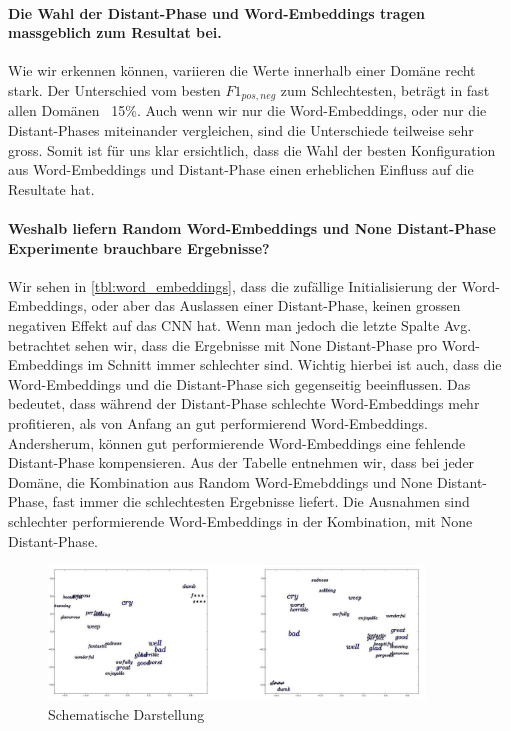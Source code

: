 \paragraph{Die Wahl der Distant-Phase und Word-Embeddings tragen massgeblich zum Resultat bei.} Wie wir erkennen können, variieren die Werte innerhalb einer Domäne recht stark. Der Unterschied vom besten $F1_{pos,neg}$ zum Schlechtesten, beträgt in fast allen Domänen ~15\%. Auch wenn wir nur die Word-Embeddings, oder nur die Distant-Phases miteinander vergleichen, sind die Unterschiede teilweise sehr gross. Somit ist für uns klar ersichtlich, dass die Wahl der besten Konfiguration aus Word-Embeddings und Distant-Phase einen erheblichen Einfluss auf die Resultate hat.
\paragraph{Weshalb liefern Random Word-Embeddings und None Distant-Phase Experimente brauchbare Ergebnisse?} Wir sehen in \ref{tbl:word_embeddings}, dass die zufällige Initialisierung der Word-Embeddings, oder aber das Auslassen einer Distant-Phase, keinen grossen negativen Effekt auf das CNN hat. Wenn man jedoch die letzte Spalte Avg. betrachtet sehen wir, dass die Ergebnisse mit None Distant-Phase pro Word-Embeddings im Schnitt immer schlechter sind. Wichtig hierbei ist auch, dass die Word-Embeddings und die Distant-Phase sich gegenseitig beeinflussen. Das bedeutet, dass während der Distant-Phase schlechte Word-Embeddings mehr profitieren, als von Anfang an gut performierend Word-Embeddings. Andersherum, können gut performierende Word-Embeddings eine fehlende Distant-Phase kompensieren. Aus der Tabelle entnehmen wir, dass bei jeder Domäne, die Kombination aus Random Word-Emebddings und None Distant-Phase, fast immer die schlechtesten Ergebnisse liefert. Die Ausnahmen sind schlechter performierende Word-Embeddings in der Kombination, mit None Distant-Phase.

\begin{figure}[h]
	\centering
	\includegraphics[width=10cm]{img/word_emebddings_veraenderung.jpg}
	\caption{Schematische Darstellung}
	\label{fig:word_embeddings}
\end{figure}

